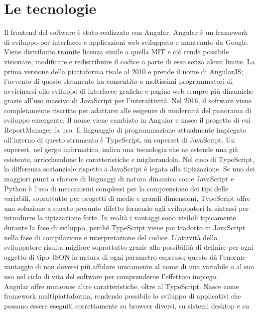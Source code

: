 \chapter{Le tecnologie}\label{c:technologies}

Il frontend del software è stato realizzato con Angular.
Angular è un framework di sviluppo per interfacce e applicazioni web sviluppato e mantenuto da Google.
Viene distribuito tramite licenza simile a quella MIT e ciò rende possibile visionare, modificare e redistribuire il codice o parte di esso senza alcun limite.
La prima versione della piattaforma risale al 2010 e prende il nome di AngularJS; l'avvento di questo strumento ha consentito a moltissimi programmatori di avvicinarsi
allo sviluppo di interfacce grafiche e pagine web sempre più dinamiche grazie all'uso massivo di JavaScript per l'interattività.
Nel 2016, il software viene completamente riscritto per adattarsi alle esigenze di modernità del panorama di sviluppo emergente.
Il nome viene cambiato in Angular e nasce il progetto di cui ReportManager fa uso.
Il linguaggio di programmazione attualmente impiegato all'interno di questo strumento è TypeScript, un superset di JavaScript.
Un superset, nel gergo informatico, indica una tecnologia che ne estende una già esistente, arricchendone le caratteristiche e migliorandola.
Nel caso di TypeScript, la differenza sostanziale rispetto a JavaScript è legata alla tipizzazione.
Se uno dei maggiori punti a sfavore di linguaggi di natura dinamica come JavaScript e Python è l'uso di meccanismi complessi per la comprensione dei tipi delle 
variabili, soprattutto per progetti di medie e grandi dimensioni, TypeScript offre una soluzione a questo presunto difetto fornendo agli sviluppatori la sintassi
per introdurre la tipizzazione forte.
In realtà i vantaggi sono visibili tipicamente durante la fase di sviluppo, perché TypeScript viene poi tradotto in JavaScript nella fase di compilazione e interpretazione del codice.
L'attività dello sviluppatore risulta migliore soprattutto grazie alla possibilità di definire per ogni oggetto di tipo JSON la natura di ogni parametro espresso; questo 
dà l'enorme vantaggio di non doversi più affidare unicamente al nome di una variabile o al suo uso nel ciclo di vita del software per comprenderne l'effettivo impiego.
\\
Angular offre numerose altre caratteristiche, oltre al TypeScript.
Nasce come framework multipiattaforma, rendendo possibile lo sviluppo di applicativi che possano essere eseguiti correttamente su browser diversi, su sistemi desktop e su 
